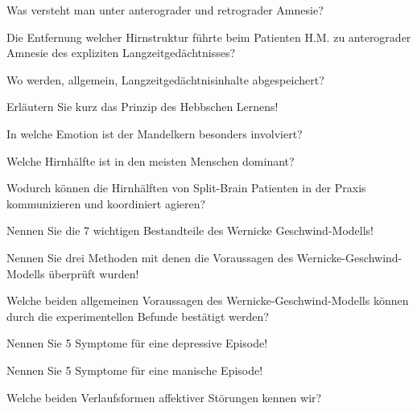 \documentclass[10pt, a4paper]{exam}
\begin{document}
\begin{questions}
\begin{solution}
  \end{solution}
  \question Was versteht man unter anterograder und retrograder Amnesie?
  \begin{solution}
  \end{solution}
  \question Die Entfernung welcher Hirnstruktur führte beim Patienten H.M. zu anterograder Amnesie des expliziten Langzeitgedächtnisses?
  \begin{solution}
  \end{solution}
  \question Wo werden, allgemein, Langzeitgedächtnisinhalte abgespeichert?
  \begin{solution}
  \end{solution}
  \question Erläutern Sie kurz das Prinzip des Hebbschen Lernens!
  \begin{solution}
  \end{solution}
  \question In welche Emotion ist der Mandelkern besonders involviert?
  \begin{solution}
  \end{solution}
  \question Welche Hirnhälfte ist in den meisten Menschen dominant?
  \begin{solution}
  \end{solution}
  \question Wodurch können die Hirnhälften von Split-Brain Patienten in der Praxis kommunizieren und koordiniert agieren?
  \begin{solution}
  \end{solution}
  \question Nennen Sie die 7 wichtigen Bestandteile des Wernicke Geschwind-Modells!
  \begin{solution}
  \end{solution}
  \question Nennen Sie drei Methoden mit denen die Voraussagen des Wernicke-Geschwind-Modells überprüft wurden!
  \begin{solution}
  \end{solution}
  \question Welche beiden allgemeinen Voraussagen des Wernicke-Geschwind-Modells können durch die experimentellen Befunde bestätigt werden?
  \begin{solution}
  \end{solution}
  \question Nennen Sie 5 Symptome für eine depressive Episode!
  \begin{solution}
  \end{solution}
  \question Nennen Sie 5 Symptome für eine manische Episode!
  \begin{solution}
  \end{solution}
  \question Welche beiden Verlaufsformen affektiver Störungen kennen wir?
  \begin{solution}

\end{solution}
\end{questions}
\end{document}
